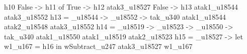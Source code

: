                                                                                                                                                                                                                                   h10
                                                                                                                                                                                                                                False ->
                                                                                                                                                                                                                                  h11 of
                                                                                                                                                                                                                           True ->
                                                                                                                                                                                                                             h12 atak3_u18527
                                                                                                                                                                                                                           False ->
                                                                                                                                                                                                                             h13 atak1_u18544 atak3_u18552
                                                                                                                                                h13 = _u18544 -> _u18552 -> tak_u340 atak1_u18544 atak2_u18548 atak3_u18552
                                                                                                                                                h14 = _u18519 -> _u18523 -> _u18550 -> tak_u340 atak1_u18550 atak1_u18519 atak2_u18523
                                                                                                                                                h15 = _u18527 -> let
                                                                                                                                                                         w1_u167 = h16
                                                                                                                                                                       in wSubtract_u247 atak3_u18527 w1_u167

